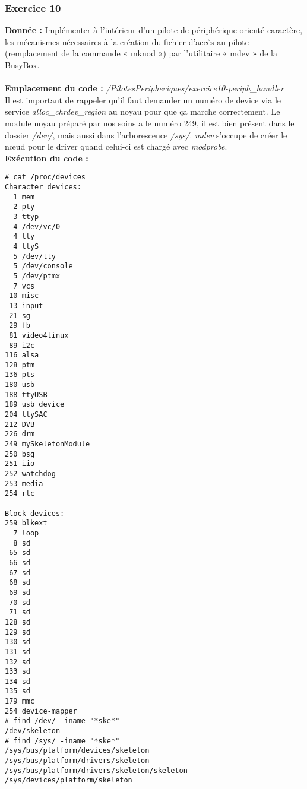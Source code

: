 \subsubsection{Exercice 10}
\textbf{Donnée : } Implémenter	à	l’intérieur	d’un	pilote	de	périphérique	orienté	caractère,	les	mécanismes	
nécessaires	à	la	création	du	fichier	d’accès	au	pilote	(remplacement	de	la	commande	« mknod »)	
par	l’utilitaire	« mdev »	de	la	BusyBox.\\\\
\textbf{Emplacement du code : } \textit{/PilotesPeripheriques/exercice10-periph\_handler}\\
Il est important de rappeler qu'il faut demander un numéro de device via le service \textit{alloc\_chrdev\_region} au noyau pour que ça marche correctement. Le module noyau préparé par nos soins a le numéro 249, il est bien présent dans le dossier \textit{/dev/}, mais aussi dans l'arborescence \textit{/sys/}. \textit{mdev} s'occupe de créer le nœud pour le driver quand celui-ci est chargé avec \textit{modprobe}.\\

\textbf{Exécution du code : } \\
\begin{lstlisting}
# cat /proc/devices 
Character devices:
  1 mem
  2 pty
  3 ttyp
  4 /dev/vc/0
  4 tty
  4 ttyS
  5 /dev/tty
  5 /dev/console
  5 /dev/ptmx
  7 vcs
 10 misc
 13 input
 21 sg
 29 fb
 81 video4linux
 89 i2c
116 alsa
128 ptm
136 pts
180 usb
188 ttyUSB
189 usb_device
204 ttySAC
212 DVB
226 drm
249 mySkeletonModule
250 bsg
251 iio
252 watchdog
253 media
254 rtc

Block devices:
259 blkext
  7 loop
  8 sd
 65 sd
 66 sd
 67 sd
 68 sd
 69 sd
 70 sd
 71 sd
128 sd
129 sd
130 sd
131 sd
132 sd
133 sd
134 sd
135 sd
179 mmc
254 device-mapper
# find /dev/ -iname "*ske*"
/dev/skeleton
# find /sys/ -iname "*ske*"
/sys/bus/platform/devices/skeleton
/sys/bus/platform/drivers/skeleton
/sys/bus/platform/drivers/skeleton/skeleton
/sys/devices/platform/skeleton
\end{lstlisting}








